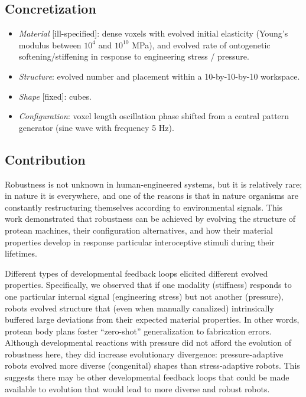 \subsection{Concretization}


\begin{itemize}
    \item \textit{Material} [ill-specified]: dense voxels with evolved initial elasticity (Young's modulus between $10^4$ and $10^{10}$ MPa), and evolved rate of ontogenetic softening/stiffening in response to engineering stress / pressure.
    \item \textit{Structure}: evolved number and placement within a 10-by-10-by-10 workspace.
    \item \textit{Shape} [fixed]: cubes.
    \item \textit{Configuration}: voxel length oscillation phase shifted from a central pattern generator (sine wave with frequency 5 Hz).
\end{itemize}



\subsection{Contribution}


Robustness is not unknown in human-engineered systems, but it is relatively rare; in nature it is everywhere, and one of the reasons is that in nature organisms are constantly restructuring themselves according to environmental signals.
This work demonstrated that robustness can be achieved by evolving the structure of protean machines, their configuration alternatives, and how
their material properties develop in response particular interoceptive stimuli during their lifetimes.

Different types of developmental feedback loops elicited different evolved properties.
Specifically, we observed that if one modality (stiffness) responds to one particular internal signal (engineering stress) but not another (pressure), robots evolved structure that (even when manually canalized) intrinsically buffered large deviations from their expected material properties.
In other words, protean body plans foster ``zero-shot'' generalization to fabrication errors.
Although developmental reactions with pressure did not afford the evolution of robustness here, they did increase evolutionary divergence: 
pressure-adaptive robots evolved more diverse 
(congenital) 
shapes than stress-adaptive robots.
This suggests
there may be other developmental feedback loops that could be made available to evolution
that would lead to more diverse and robust robots.




